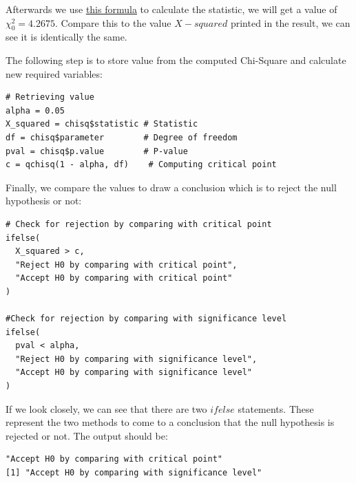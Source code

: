 \documentclass[a4paper]{article}
\numberwithin{equation}{section}
\begin{document}
Afterwards we use \hyperref[chi:stat]{\underline{this formula}} to calculate the statistic, we will get a value of \( \chi_0^2 = 4.2675\). Compare this to the value \( X-squared \) printed in the result, we can see it is identically the same.

The following step is to store value from the computed Chi-Square and calculate new required variables:
\begin{mdframed}[leftline=false,rightline=false,backgroundcolor=magenta!10,nobreak=true]
  \begin{verbatim}
# Retrieving value
alpha = 0.05
X_squared = chisq$statistic # Statistic
df = chisq$parameter        # Degree of freedom
pval = chisq$p.value        # P-value
c = qchisq(1 - alpha, df)    # Computing critical point
  \end{verbatim}
\end{mdframed}

Finally, we compare the values to draw a conclusion which is to reject the null hypothesis or not:
\begin{mdframed}[leftline=false,rightline=false,backgroundcolor=magenta!10,nobreak=true]
  \begin{verbatim}
# Check for rejection by comparing with critical point
ifelse(
  X_squared > c,
  "Reject H0 by comparing with critical point",
  "Accept H0 by comparing with critical point"
)

#Check for rejection by comparing with significance level
ifelse(
  pval < alpha,
  "Reject H0 by comparing with significance level",
  "Accept H0 by comparing with significance level"
)
  \end{verbatim}
\end{mdframed}

If we look closely, we can see that there are two \(ifelse\) statements. These represent the two methods to come to a conclusion that the null hypothesis is rejected or not. The output should be:
\begin{mdframed}[leftline=false,rightline=false,backgroundcolor=teal!10,nobreak=true]
  \begin{verbatim}
"Accept H0 by comparing with critical point"
[1] "Accept H0 by comparing with significance level"
  \end{verbatim}
\end{mdframed}
\end{document}
